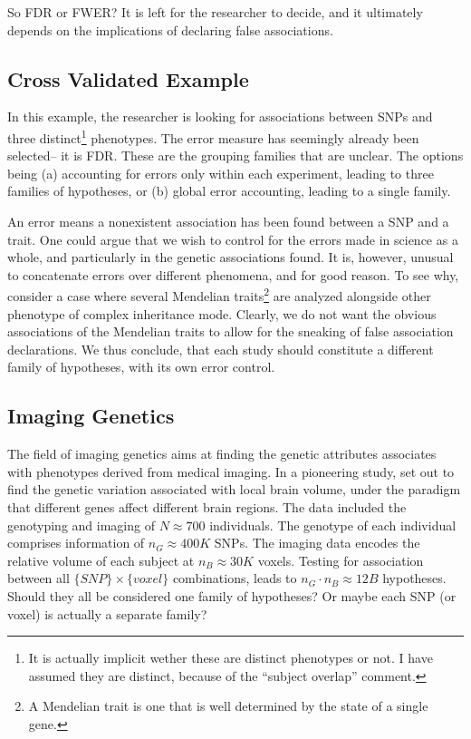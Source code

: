 \documentclass[review,12pt]{article}
\begin{document}
So FDR or FWER? It is left for the researcher to decide, and it ultimately depends on the implications of declaring false associations. 





\subsection{\label{sec:cross_validated}Cross Validated Example}

In this example, the researcher is looking for associations between SNPs and three distinct\footnote{ It is actually implicit wether these are distinct phenotypes or not. I have assumed they are distinct, because of the ``subject overlap'' comment.} phenotypes. The error measure has seemingly already been selected-- it is FDR. These are the grouping families that are unclear. 
The options being (a) accounting for errors only within each experiment, leading to three families of hypotheses, or (b) global error accounting, leading to a single family. 

An error means a nonexistent association has been found between a SNP and a trait. One could argue that we wish to control for the errors made in science as a whole, and particularly in the genetic associations found. It is, however, unusual to concatenate errors over different phenomena, and for good reason. 
To see why, consider a case where several Mendelian traits\footnote{ A Mendelian trait is one that is well determined by the state of a single gene.} are analyzed alongside other phenotype of complex inheritance mode. Clearly, we do not want the obvious associations of the Mendelian traits to allow for the sneaking of false association declarations. We thus conclude, that each study should constitute a different family of hypotheses, with its own error control.






\subsection{\label{eg:imaging_genetics}Imaging Genetics}

The field of imaging genetics aims at finding the genetic attributes associates with phenotypes derived from medical imaging. In a pioneering study, \citet{stein_voxelwise_2010} set out to find the genetic variation associated with local brain volume, under the paradigm that different genes affect different brain regions. 
The data included the genotyping and imaging of $N \approx 700$ individuals. 
The genotype of each individual comprises information of $n_G \approx 400K$ SNPs. 
The imaging data encodes the relative volume of each subject at $n_B \approx 30K$ voxels. 
Testing for association between all $\{SNP\} \times \{voxel\}$ combinations, leads to $n_G \cdot n_B \approx 12B$ hypotheses. Should they all be considered one family of hypotheses? Or maybe each SNP (or voxel) is actually a separate family? 
\end{document}
